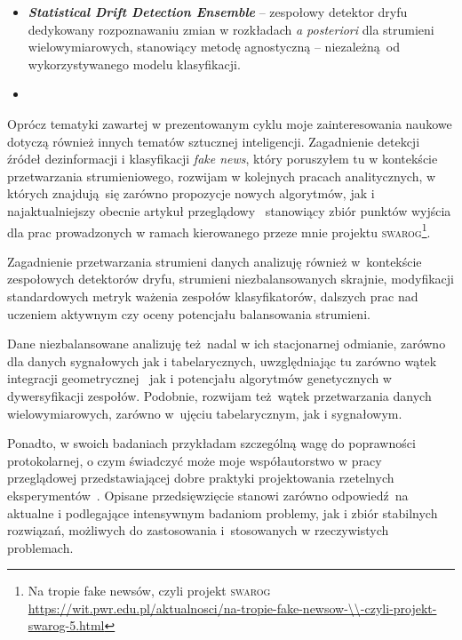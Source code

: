 \begin{itemize}
	\item \textbf{\emph{Statistical Drift Detection Ensemble}} -- zespołowy detektor dryfu dedykowany rozpoznawaniu zmian w rozkładach \emph{a posteriori} dla strumieni wielowymiarowych, stanowiący metodę agnostyczną -- niezależną od wykorzystywanego modelu klasyfikacji.
	\item[]\vspace{-.5em} \emph{\footnotesize\color{red}}
	 
\end{itemize}


\noindent Oprócz tematyki zawartej w prezentowanym cyklu moje zainteresowania naukowe dotyczą również innych tematów sztucznej inteligencji. Zagadnienie detekcji źródeł dezinformacji i klasyfikacji \emph{fake news}, który poruszyłem tu w kontekście przetwarzania strumieniowego, rozwijam w kolejnych pracach analitycznych, w których znajdują się zarówno propozycje nowych algorytmów, jak i najaktualniejszy obecnie artykuł przeglądowy~ stanowiący zbiór punktów wyjścia dla prac prowadzonych w ramach kierowanego przeze mnie projektu \textsc{swarog}\footnote{Na tropie fake newsów, czyli projekt \textsc{swarog}\\\noindent\url{https://wit.pwr.edu.pl/aktualnosci/na-tropie-fake-newsow-\\-czyli-projekt-swarog-5.html}}.


Zagadnienie przetwarzania strumieni danych analizuję również w~kontekście zespołowych detektorów dryfu, strumieni niezbalansowanych skrajnie, modyfikacji standardowych metryk ważenia zespołów klasyfikatorów, dalszych prac nad uczeniem aktywnym czy oceny potencjału balansowania strumieni. 

Dane niezbalansowane analizuję też nadal w ich stacjonarnej odmianie, zarówno dla danych sygnałowych jak i tabelarycznych, uwzględniając tu zarówno wątek integracji geometrycznej~ jak i potencjału algorytmów genetycznych w dywersyfikacji zespołów. Podobnie, rozwijam też wątek przetwarzania danych wielowymiarowych, zarówno w~ujęciu tabelarycznym, jak i sygnałowym.

Ponadto, w swoich badaniach przykładam szczególną wagę do poprawności protokolarnej, o czym świadczyć może moje współautorstwo w pracy przeglądowej przedstawiającej dobre praktyki projektowania rzetelnych eksperymentów~. Opisane przedsięwzięcie stanowi zarówno odpowiedź na aktualne i podlegające intensywnym badaniom problemy, jak i zbiór stabilnych rozwiązań, możliwych do zastosowania i~stosowanych w rzeczywistych problemach.

